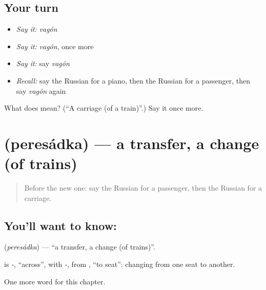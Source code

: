 \subsection*{Your turn}
\begin{itemize}
\raggedright
  \item \emph{Say it:} \emph{vagón}
  \item \emph{Say it:} \emph{vagón}, once more
  \item \emph{Say it:} say \emph{vagón}
  \item \emph{Recall:} say the Russian for a piano, then the Russian for a passenger, then say \emph{vagón} again
\end{itemize}

\begin{tcolorbox}[breakable,colback=teal!4,colframe=teal!35!black,title={Before you move on}]
What does  mean? (\textquotedblleft{}A carriage (of a train)\textquotedblright{}.) Say it once more.
\end{tcolorbox}
\section[\texorpdfstring{\ru{пересадка} (peresádka)}{пересадка (peresádka)}]{ (peresádka) — a transfer, a change (of trains)}

\label{lesson:RU-C198-peresadka}



\begin{quote}
Before the new one: say the Russian for a passenger, then the Russian for a carriage.
\end{quote}

\subsection*{You'll want to know: }
\textbf{} (\emph{peresádka}) — \textquotedblleft{}a transfer, a change (of trains)\textquotedblright{}.

\begin{cousinweb}
\textbf{} is \emph{-}, \textquotedblleft{}across\textquotedblright{}, with \emph{-}, from \emph{}, \textquotedblleft{}to seat\textquotedblright{}: changing from one seat to another.
\end{cousinweb}

\begin{grammarlens}[title={What you've built}]
One more word for this chapter.
\end{grammarlens}

